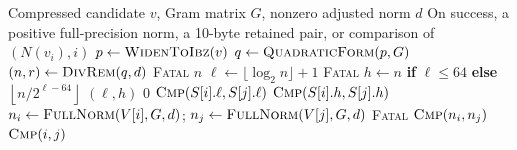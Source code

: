 \documentclass[a4paper,10pt]{article}
\theoremstyle{definition}
\theoremstyle{remark}
\begin{document}
\begin{algorithm}[H]
  \caption{Norm comparison with full-precision fallback when required}
  \label{alg:sketch-order}
  \small
  \begin{algorithmic}[1]
    \Require Compressed candidate $v$, Gram matrix $G$, nonzero adjusted norm $d$
    \Ensure On success, a positive full-precision norm, a 10-byte retained pair, or comparison of $(N(v_i),i)$
      \State $p\gets\Call{WidenToIbz}{v}$
      \State $q\gets\Call{QuadraticForm}{p,G}$ 
      \State $(n,r)\gets\Call{DivRem}{q,d}$
        \State \Return \textsc{Fatal}
      \EndIf
      \State \Return $n$
    \EndFunction
      \State $\ell\gets\lfloor\log_2 n\rfloor+1$
        \State \Return \textsc{Fatal}
      \EndIf
      \State $h\gets n$ \textbf{if} $\ell\leq64$ \textbf{else} $\left\lfloor n/2^{\ell-64}\right\rfloor$
      \State \Return $(\ell,h)$ 
    \EndFunction
        \State \Return $0$
        \State \Return $\Call{Cmp}{S[i].\ell,S[j].\ell}$
        \State \Return $\Call{Cmp}{S[i].h,S[j].h}$
      \EndIf
      \State $n_i\gets\Call{FullNorm}{V[i],G,d}$; $n_j\gets\Call{FullNorm}{V[j],G,d}$
        \State \Return \textsc{Fatal}
        \State \Return $\Call{Cmp}{n_i,n_j}$
      \Else
        \State \Return $\Call{Cmp}{i,j}$ 
      \EndIf
    \EndFunction
  \end{algorithmic}
\end{algorithm}
\end{document}
